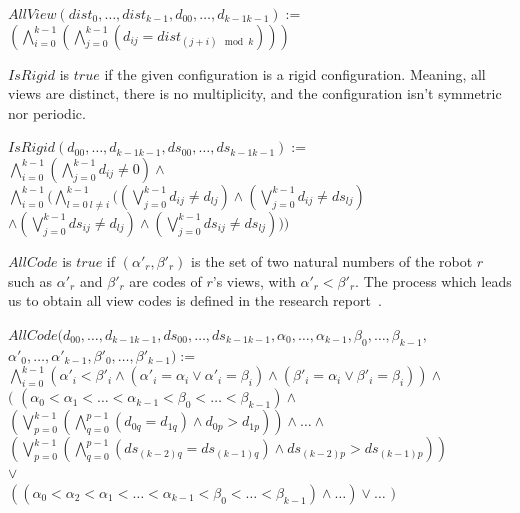 \documentclass{article}
\begin{document}
\begin{center}
    
$AllView (dist_{0}, \ldots ,dist_{k-1}, d_{00}, \ldots ,d_{k-1k-1}):=$\\
$ (\bigwedge_{i=0}^{k-1}  (\bigwedge_{j=0}^{k-1}  (d_{ij} = dist_{ (j+i) \mod{k}}) ) )$
\end{center}

$IsRigid$ is $true$ if the given configuration is a rigid configuration. Meaning, all views are distinct, there is no multiplicity, and the configuration isn't symmetric nor periodic.

\begin{center}

$IsRigid (d_{00}, \ldots ,d_{k-1k-1}, ds_{00}, \ldots ,ds_{k-1k-1}):=$\\
$\bigwedge_{i=0}^{k-1} (\bigwedge_{j=0}^{k-1}d_{ij}\not=0)\land $\\%
$\bigwedge_{i=0}^{k-1} (
\bigwedge_{l=0\ l\not=i}^{k-1} (
 (\bigvee_{j=0}^{k-1}d_{ij} \not= d_{lj})
\land  (\bigvee_{j=0}^{k-1}d_{ij} \not= ds_{lj})$\\
$\land  (\bigvee_{j=0}^{k-1}ds_{ij} \not= d_{lj})
\land  (\bigvee_{j=0}^{k-1}ds_{ij} \not= ds_{lj})
) )$\\%
\end{center}

$AllCode$ is $true$ if $ (\alpha'_{r}, \beta'_{r})$ is the set of two natural numbers of the robot $r$ such as $\alpha'_r$ and $\beta'_r$ are codes of $r$'s views, with $\alpha'_{r} < \beta'_{r}$. The process which leads us to obtain all view codes is defined in the research report~\cite{gathering}. 

\begin{center}
$AllCode (d_{00}, \ldots ,d_{k-1k-1}, ds_{00}, \ldots ,ds_{k-1k-1}, \alpha_{0}, \dots, \alpha_{k-1}, \beta_{0}, \dots, \beta_{k-1},$\\
$\alpha'_{0}, \dots, \alpha'_{k-1}, \beta'_{0}, \dots, \beta'_{k-1}):=$\\
$\bigwedge_{i = 0}^{k-1} \left ( \alpha'_{i} < \beta'_{i} \land  (\alpha'_{i} = \alpha_{i} \lor \alpha'_{i} = \beta_{i}) \land  (\beta'_{i} = \alpha_{i} \lor \beta'_{i} = \beta_{i}) \right) \land $\\
$ ($
$ (\alpha_{0} < \alpha_{1} < \dots < \alpha_{k-1} < \beta_{0} < \dots < \beta_{k-1}) \land $\\
$ (\bigvee_{p=0}^{k-1} (\bigwedge_{q=0}^{p-1} (d_{0q} = d_{1q}) \land d_{0p} > d_{1p} ) )\land \dots \land $\\
$ (\bigvee_{p=0}^{k-1} (\bigwedge_{q=0}^{p-1} (ds_{ (k-2)q} = ds_{ (k-1)q}) \land ds_{ (k-2)p} > ds_{ (k-1)p} ) )$\\
$\lor $\\
$ ( (\alpha_{0} < \alpha_{2} < \alpha_{1} < \dots < \alpha_{k-1} < \beta_{0} < \dots < \beta_{k-1}) \land \dots) \lor \dots$
$)$
\end{center}
\end{document}
